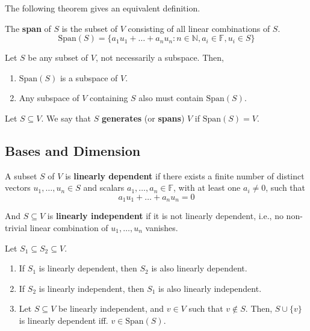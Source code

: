 The following theorem gives an equivalent definition.

\begin{theorem}
	The \textbf{span} of $S$ is the subset of $V$ consisting of all linear combinations of $S$.
	\[
		\text{Span}(S) = \{ a_1 u_1 + \ldots + a_n u_n : n \in \mathbb{N}, a_i \in \mathbb{F}, u_i \in S \}
	\]
\end{theorem}

\begin{theorem}
	Let $S$ be any subset of $V$, not necessarily a subspace. Then,
	\begin{enumerate}
		\item $\text{Span}(S)$ is a subspace of $V$.
		\item Any subspace of $V$ containing $S$ also must contain $\text{Span}(S)$.
	\end{enumerate}
\end{theorem}

\begin{definition}
	Let $S \subseteq V$. We say that $S$ \textbf{generates} (or \textbf{spans}) $V$ if $\text{Span}(S) = V$.
\end{definition}

\subsection*{Bases and Dimension}

\begin{definition}
	A subset $S$ of $V$ is \textbf{linearly dependent} if there exists a finite number of distinct vectors $u_1, \ldots, u_n \in S$ and scalars $a_1, \ldots, a_n \in \mathbb{F}$, with at least one $a_i \neq 0$, such that 
	\[
		a_1 u_1 + \ldots + a_n u_n = 0
	\]

	And $S \subseteq V$ is \textbf{linearly independent} if it is not linearly dependent, i.e., no non-trivial linear combination of $u_1, \ldots, u_n$ vanishes.
\end{definition}

\begin{theorem}
	Let $S_1 \subseteq S_2 \subseteq V$. 
	\begin{enumerate}
		\item If $S_1$ is linearly dependent, then $S_2$ is also linearly dependent. 
		\item If $S_2$ is linearly independent, then $S_1$ is also linearly independent. 
		\item Let $S \subseteq V$ be linearly independent, and $v \in V$ such that $v \not\in S$. Then, $S \cup \{ v \}$ is linearly dependent iff. $v \in \text{Span}(S)$.
	\end{enumerate}
\end{theorem}


